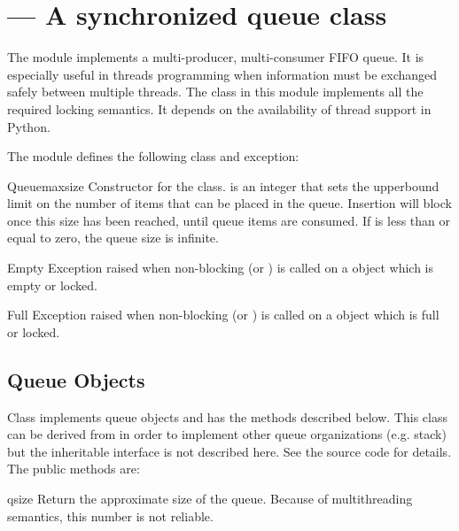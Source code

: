 \section{ ---
         A synchronized queue class}



The  module implements a multi-producer, multi-consumer
FIFO queue.  It is especially useful in threads programming when
information must be exchanged safely between multiple threads.  The
 class in this module implements all the required locking
semantics.  It depends on the availability of thread support in
Python.

The  module defines the following class and exception:


\begin{classdesc}{Queue}{maxsize}
Constructor for the class.   is an integer that sets the
upperbound limit on the number of items that can be placed in the
queue.  Insertion will block once this size has been reached, until
queue items are consumed.  If  is less than or equal to
zero, the queue size is infinite.
\end{classdesc}

\begin{excdesc}{Empty}
Exception raised when non-blocking  (or
) is called on a  object which is
empty or locked.
\end{excdesc}

\begin{excdesc}{Full}
Exception raised when non-blocking  (or
) is called on a  object which is
full or locked.
\end{excdesc}

\subsection{Queue Objects}
\label{QueueObjects}

Class  implements queue objects and has the methods
described below.  This class can be derived from in order to implement
other queue organizations (e.g. stack) but the inheritable interface
is not described here.  See the source code for details.  The public
methods are:

\begin{methoddesc}{qsize}{}
Return the approximate size of the queue.  Because of multithreading
semantics, this number is not reliable.
\end{methoddesc}

